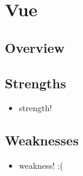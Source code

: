 
\section{Vue}
\label{sec:vue}

\subsection{Overview}
\label{subsec:vue:overview}

\subsection{Strengths}
\label{subsec:vue:strengths}
\begin{itemize}
    \item strength! 
\end{itemize}

\subsection{Weaknesses}
\label{subsec:vue:weaknesses}
\begin{itemize}
    \item weakness! :( 
\end{itemize}